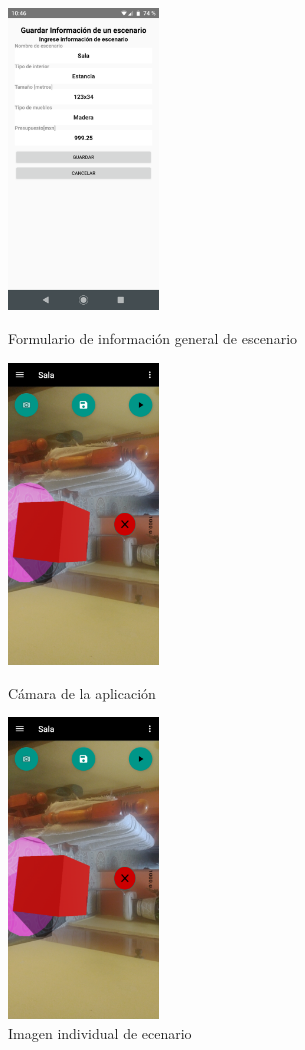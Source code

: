 \begin{figure}[hbt!]
	\begin{minipage}{0.32\textwidth}
		\centering
		\includegraphics[width=4cm,height=8cm]{imagenes/desarrollo/app/presave_scenario.png}
		\caption{Formulario de información general de escenario}
		\label{fig:infosc}
	\end{minipage}\hfill
	\begin{minipage}{0.32\textwidth}
		\centering
		\includegraphics[width=4cm,height=8cm]{imagenes/desarrollo/app/camera01.png}
		\caption{Cámara de la aplicación}
		\label{fig:camera01}
	\end{minipage}\hfill
	\begin{minipage}{0.32\textwidth}
		\centering
		\includegraphics[width=4cm,height=8cm]{imagenes/desarrollo/app/camera01.png}
		\caption{Imagen individual de ecenario}
		\label{fig:scimg}
	\end{minipage}\hfill
\end{figure}



